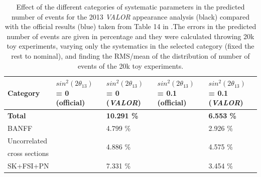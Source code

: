 \begin{table}[htbp]
\center
\begin{tabular} {|p{2cm}|p{2.5cm}|p{2.5cm}||p{2.5cm}|p{2.5cm}|}
\hline
Category  & $sin^{2}(2\theta_{13})$ = 0 (official) & $sin^{2}(2\theta_{13})$ = 0  ({\em VALOR}) & $sin^{2}(2\theta_{13})$ = 0.1 (official) & $sin^{2}(2\theta_{13})$ = 0.1 ({\em VALOR}) \\
\hline \hline
\textbf{Total}  & \textbf{\color{blue}{ 11.4\%}} &\textbf{ 10.291 \%} & \textbf{\color{blue}{ 8.9\%}} & \textbf{6.553 \%}  \\
\hline
BANFF  & \color{blue}{ 4.8\%}  & 4.799 \% & \color{blue}{ 2.9\%}  & 2.926 \% \\
\hline
 Uncorrelated  & \multirow{2}{*}{\color{blue}{ 7.1\%}} & \multirow{2}{*}{4.886 \%} & \multirow{2}{*}{\color{blue}{ 7.6\%}}  & \multirow{2}{*}{4.575 \%} \\
 cross sections & & & & \\
\hline
SK+FSI+PN  & \color{blue}{ 7.3\%} & 7.331 \% & \color{blue}{ 3.5\%} & 3.454 \%\\
\hline
\end{tabular}
\caption{Effect of the different categories of systematic parameters in the predicted number of events for the 2013 {\em VALOR} appearance analysis (black) compared with the official results (blue) taken from Table 14 in \cite{2013nueptheta}.The errors in the predicted number of events are given in percentage and they were calculated throwing 20k toy experiments, varying only the systematics in the selected category (fixed the rest to nominal), and finding the RMS/mean of the distribution of number of events of the 20k toy experiments.}
\label{tab:systnuenskcat}
\end{table}



